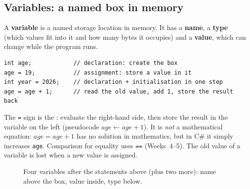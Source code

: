 \subsection{Variables: a named box in memory}
\begin{defbox}
A \textbf{variable} is a named storage location in memory. It has a \textbf{name}, a \textbf{type} (which values fit into it and how many bytes it occupies) and a \textbf{value}, which can change while the program runs.
\end{defbox}
\begin{lstlisting}[numbers=none]
int age;            // declaration: create the box
age = 19;           // assignment: store a value in it
int year = 2026;    // declaration + initialisation in one step
age = age + 1;      // read the old value, add 1, store the result back
\end{lstlisting}
The \texttt{=} sign is the : evaluate the right-hand side, then store the result in the variable on the left (pseudocode $age \gets age + 1$). It is \emph{not} a mathematical equation: $age = age + 1$ has no solution in mathematics, but in C\# it simply increases \texttt{age}. Comparison for equality uses \texttt{==} (Weeks~4--5). The old value of a variable is lost when a new value is assigned.

\begin{figure}[h]\centering
{}
\caption{Four variables after the statements above (plus two more): name above the box, value inside, type below.}\label{fig:boxes}
\end{figure}

